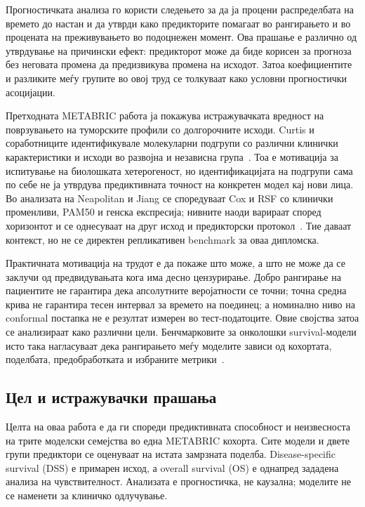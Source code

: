 \documentclass[12pt]{article}
\begin{document}
Прогностичката анализа го користи следењето за да ја процени распределбата на времето до настан и да утврди како предикторите помагаат во рангирањето и во процената на преживувањето во подоцнежен момент. Ова прашање е различно од утврдување на причински ефект: предикторот може да биде корисен за прогноза без неговата промена да предизвикува промена на исходот. Затоа коефициентите и разликите меѓу групите во овој труд се толкуваат како условни прогностички асоцијации.

Претходната METABRIC работа ја покажува истражувачката вредност на поврзувањето на туморските профили со долгорочните исходи. Curtis и соработниците идентификувале молекуларни подгрупи со различни клинички карактеристики и исходи во развојна и независна група~\cite{curtis2012}. Тоа е мотивација за испитување на биолошката хетерогеност, но идентификацијата на подгрупи сама по себе не ја утврдува предиктивната точност на конкретен модел кај нови лица. Во анализата на Neapolitan и Jiang се споредуваат Cox и RSF со клинички променливи, PAM50 и генска експресија; нивните наоди варираат според хоризонтот и се однесуваат на друг исход и предикторски протокол~\cite{neapolitan2015}. Тие даваат контекст, но не се директен репликативен benchmark за оваа дипломска.

Практичната мотивација на трудот е да покаже што може, а што не може да се заклучи од предвидувањата кога има десно цензурирање. Добро рангирање на пациентите не гарантира дека апсолутните веројатности се точни; точна средна крива не гарантира тесен интервал за времето на поединец; а номинално ниво на conformal постапка не е резултат измерен во тест-податоците. Овие својства затоа се анализираат како различни цели. Бенчмарковите за онколошки survival-модели исто така нагласуваат дека рангирањето меѓу моделите зависи од кохортата, поделбата, предобработката и избраните метрики~\cite{wissel2025}.

\subsection{Цел и истражувачки прашања}

Целта на оваа работа е да ги спореди предиктивната способност и неизвесноста на трите моделски семејства во една METABRIC кохорта. Сите модели и двете групи предиктори се оценуваат на истата замрзната поделба. Disease-specific survival (DSS) е примарен исход, а overall survival (OS) е однапред зададена анализа на чувствителност. Анализата е прогностичка, не каузална; моделите не се наменети за клиничко одлучување.
\end{document}
